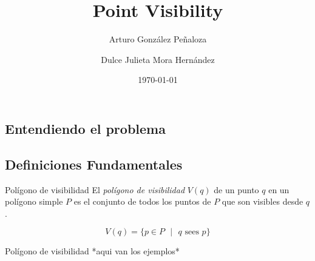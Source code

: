 \documentclass[aspectratio=169,xcolor=dvipsnames, t]{beamer}
\title[short title]{Point Visibility} %
\author{Arturo González Peñaloza \and Dulce Julieta Mora Hernández}
\institute[Short title]{
Universidad Nacional Autónoma de México
}
\date{\today} %
\let\oldsection\section
\renewcommand{\section}[2][\relax]{%
    \ifx#1\relax
      \oldsection{#2}%
    \else
      \oldsection[#1]{#2}%
    \fi%
    \label{sec:\thesection}%
}
\begin{document}
\maketitlepage
\begin{frame}[t]
    \tableofcontents
\end{frame}



\subsection{Entendiendo el problema}
\subsection{Definiciones Fundamentales}


\begin{frame}{Polígono de visibilidad}
    El \textit{polígono de visibilidad} $V(q)$ de un punto $q$ en un polígono simple $P$ es el conjunto de todos los puntos de $P$ que son visibles desde $q$.
    \begin{center}
        \begin{equation*}
             V(q) = \{ p \in P \text{ } | \text{ } q \text{ sees } p \}
        \end{equation*}
    \end{center}
\end{frame}


\begin{frame}{Polígono de visibilidad}
    *aqui van los ejemplos*
\end{frame}

\end{document}
